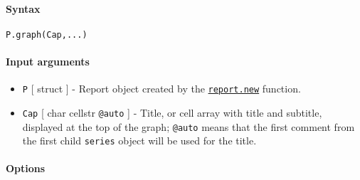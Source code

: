 


	\paragraph{Syntax}

\begin{verbatim}
P.graph(Cap,...)
\end{verbatim}

\paragraph{Input arguments}

\begin{itemize}
\item
  \texttt{P} {[} struct {]} - Report object created by the
  \href{report/new}{\texttt{report.new}} function.
\item
  \texttt{Cap} {[} char \textbar{} cellstr \textbar{} \texttt{@auto} {]}
  - Title, or cell array with title and subtitle, displayed at the top
  of the graph; \texttt{@auto} means that the first comment from the
  first child \texttt{series} object will be used for the title.
\end{itemize}

\paragraph{Options}

